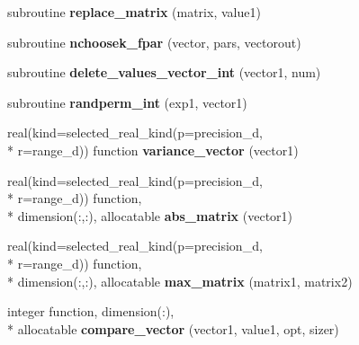 \begin{DoxyCompactItemize}
\item 
\hypertarget{classcommon__functions_a5308c8e91e5432eb01d3ddc645b3dda1}{subroutine {\bfseries replace\-\_\-matrix} (matrix, value1)}\label{classcommon__functions_a5308c8e91e5432eb01d3ddc645b3dda1}

\item 
\hypertarget{classcommon__functions_a310685dfd3e72477242923d459a3335c}{subroutine {\bfseries nchoosek\-\_\-fpar} (vector, pars, vectorout)}\label{classcommon__functions_a310685dfd3e72477242923d459a3335c}

\item 
\hypertarget{classcommon__functions_aefa037c083f908062d3a59d71d360580}{subroutine {\bfseries delete\-\_\-values\-\_\-vector\-\_\-int} (vector1, num)}\label{classcommon__functions_aefa037c083f908062d3a59d71d360580}

\item 
\hypertarget{classcommon__functions_af4ebac2f558e171676a5d194d77330ca}{subroutine {\bfseries randperm\-\_\-int} (exp1, vector1)}\label{classcommon__functions_af4ebac2f558e171676a5d194d77330ca}

\item 
\hypertarget{classcommon__functions_a17bee7c131a38dcb3376aa73290dfe1d}{real(kind=selected\-\_\-real\-\_\-kind(p=precision\-\_\-d, \\*
r=range\-\_\-d)) function {\bfseries variance\-\_\-vector} (vector1)}\label{classcommon__functions_a17bee7c131a38dcb3376aa73290dfe1d}

\item 
\hypertarget{classcommon__functions_a71ba5a4f09a7342650c5af54ddb63dc0}{real(kind=selected\-\_\-real\-\_\-kind(p=precision\-\_\-d, \\*
r=range\-\_\-d)) function, \\*
dimension(\-:,\-:), allocatable {\bfseries abs\-\_\-matrix} (vector1)}\label{classcommon__functions_a71ba5a4f09a7342650c5af54ddb63dc0}

\item 
\hypertarget{classcommon__functions_a85fb861d16d842fb51a4b80c38a3f31e}{real(kind=selected\-\_\-real\-\_\-kind(p=precision\-\_\-d, \\*
r=range\-\_\-d)) function, \\*
dimension(\-:,\-:), allocatable {\bfseries max\-\_\-matrix} (matrix1, matrix2)}\label{classcommon__functions_a85fb861d16d842fb51a4b80c38a3f31e}

\item 
\hypertarget{classcommon__functions_a281058379b43ef0e38b312192961ee88}{integer function, dimension(\-:), \\*
allocatable {\bfseries compare\-\_\-vector} (vector1, value1, opt, sizer)}\label{classcommon__functions_a281058379b43ef0e38b312192961ee88}


\end{DoxyCompactItemize}
